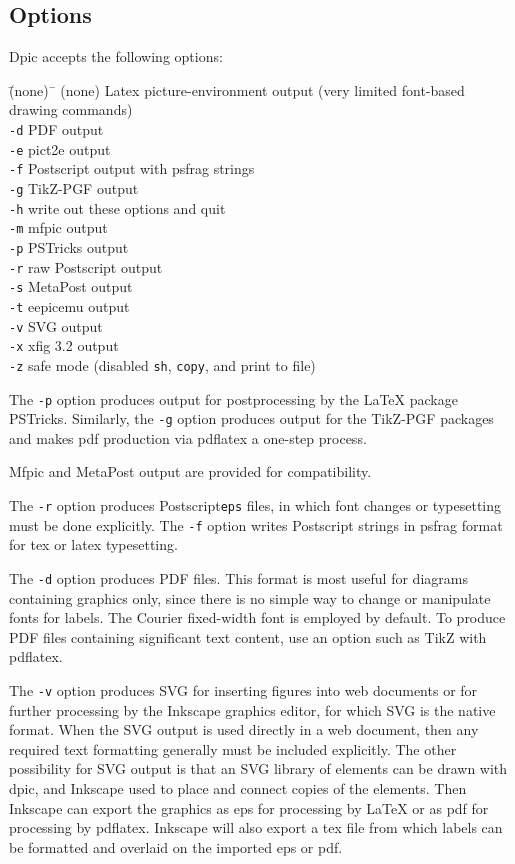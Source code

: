\documentclass[11pt]{article}
\newcommand{\bq}{}
\newcommand{\Dpic}{{\bq Dpic}\xspace}
\renewcommand{\LaTeX}{{LaTeX}\xspace}
\newcommand{\PSTricks}{{\bq PSTricks}\xspace}
\newcommand{\MetaPost}{{\bq MetaPost}\xspace}
\newcommand{\Postscript}{{\bq Postscript}\xspace}
\begin{document}
\subsection{Options}
\Dpic accepts the following options:
\begin{tabbing}
\quad\=\hbox{(none)\ }\= \kill
\> (none) \> Latex picture-environment output (very limited font-based
 drawing commands)\\
\> {\tt -d} \> PDF output \\
\> {\tt -e} \> pict2e output \\
\> {\tt -f} \> Postscript output with psfrag strings \\
\> {\tt -g} \> TikZ-PGF output \\
\> {\tt -h} \> write out these options and quit \\
\> {\tt -m} \> mfpic output \\
\> {\tt -p} \> PSTricks output \\
\> {\tt -r} \> raw Postscript output \\
\> {\tt -s} \> MetaPost output \\
\> {\tt -t} \> eepicemu output \\
\> {\tt -v} \> SVG output \\
\> {\tt -x} \> xfig 3.2 output \\
\> {\tt -z} \> safe mode (disabled {\tt sh}, {\tt copy}, and print to file)
\end{tabbing}

The {\tt -p} option produces output for postprocessing by the
LaTeX package \PSTricks.
Similarly, the {\tt -g} option produces output
for the TikZ-PGF packages and makes pdf production
via pdflatex a one-step process.

Mfpic and \MetaPost output are provided for
compatibility.

The {\tt -r} option produces \Postscript {\tt eps}
files, in which font changes or typesetting must be done explicitly.
The {\tt -f} option writes \Postscript strings in psfrag
format for tex or latex typesetting.

The {\tt -d} option produces PDF files.
This format is most useful for diagrams containing graphics only, since
there is no simple way to change or manipulate fonts for labels.
The Courier fixed-width font is employed by default.
To produce PDF files containing significant text content,
use an option such as TikZ with pdflatex.

The {\tt -v} option produces SVG for inserting figures into web documents or for
further processing by the Inkscape graphics editor, for which SVG is the
native format.
When the SVG output is used directly in a web document,
then any required text formatting generally must be included explicitly.
The other possibility for SVG output is that an SVG library of elements
can be drawn with dpic, and Inkscape used to place and connect copies
of the elements.  Then Inkscape can export the graphics as eps for
processing by \LaTeX or as pdf for processing by pdflatex.  Inkscape
will also export a tex file from which labels can be formatted and
overlaid on the imported eps or pdf.
\end{document}
